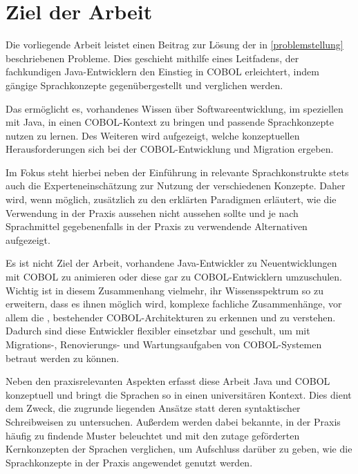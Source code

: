 \section{Ziel der Arbeit}
Die vorliegende Arbeit leistet einen Beitrag zur Lösung der in \autoref{problemstellung} beschriebenen Probleme. Dies geschieht mithilfe eines Leitfadens, der fachkundigen Java-Entwicklern den Einstieg in COBOL erleichtert, indem gängige Sprachkonzepte gegenübergestellt und verglichen werden. 

Das ermöglicht es, vorhandenes Wissen über Softwareentwicklung, im speziellen mit Java, in einen COBOL-Kontext zu bringen und passende Sprachkonzepte nutzen zu lernen. Des Weiteren wird aufgezeigt, welche konzeptuellen Herausforderungen sich bei der COBOL-Entwicklung und Migration ergeben.

Im Fokus steht hierbei neben der Einführung in relevante Sprachkonstrukte stets auch die Experteneinschätzung zur Nutzung der verschiedenen Konzepte. Daher wird, wenn möglich, zusätzlich zu den erklärten Paradigmen erläutert, wie die Verwendung in der Praxis aussehen \bzw nicht aussehen sollte und je nach Sprachmittel gegebenenfalls in der Praxis zu verwendende Alternativen aufgezeigt.

Es ist nicht Ziel der Arbeit, vorhandene Java-Entwickler zu Neuentwicklungen mit COBOL zu animieren oder diese gar zu COBOL-Entwicklern umzuschulen. Wichtig ist in diesem Zusammenhang vielmehr, ihr Wissensspektrum so zu erweitern, dass es ihnen möglich wird, komplexe fachliche Zusammenhänge, vor allem die , bestehender COBOL-Architekturen zu erkennen und zu verstehen. Dadurch sind diese Entwickler flexibler einsetzbar und geschult, um mit Migrations-, Renovierungs- und Wartungsaufgaben von COBOL-Systemen betraut werden zu können.

Neben den praxisrelevanten Aspekten erfasst diese Arbeit Java und COBOL konzeptuell und bringt die Sprachen so in einen universitären Kontext. Dies dient dem Zweck, die zugrunde liegenden Ansätze statt deren syntaktischer Schreibweisen zu untersuchen. Außerdem werden dabei bekannte, in der Praxis häufig zu findende Muster beleuchtet und mit den zutage geförderten Kernkonzepten der Sprachen verglichen, um Aufschluss darüber zu geben, wie die Sprachkonzepte in der Praxis angewendet \bzw genutzt werden.